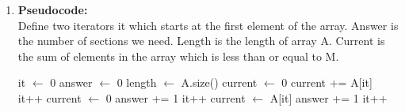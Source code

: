\begin{solution}
    \begin{enumerate}
        \item \textbf{Pseudocode:}\\
              Define two iterators it which starts at the first element of the array.
              Answer is the number of sections we need. Length is the length of array A.
              Current is the sum of elements in the array which is less than or equal to M.
              \begin{algorithm}[H]
                  \color{blue}
                  \begin{algorithmic}[1]
                      \State it $\gets$ 0
                      \State answer $\gets$ 0
                      \State length $\gets$ A.size()
                      \State current $\gets$ 0
                      \State current += A[it]
                      \State it++
                      \State current $\gets$ 0
                      \State answer += 1
                      \State it++
                      \Else
                      \State current $\gets$ A[it]
                      \State answer += 1
                      \State it++
                      \EndIf
                      \EndWhile
                      \EndFunction
                  \end{algorithmic}
              \end{algorithm}
    \end{enumerate}
\end{solution}
\newpage
